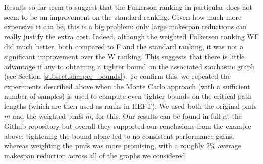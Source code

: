 \documentclass[12pt]{article}
\begin{document}


Results so far seem to suggest that the Fulkerson ranking in particular does not seem to be an improvement on the standard ranking. Given how much more expensive it can be, this is a big problem: only large makespan reductions can really justify the extra cost. Indeed, although the weighted Fulkerson ranking WF did much better, both compared to F and the standard ranking, it was not a significant improvement over the W ranking. This suggests that there is little advantage if any to obtaining a tighter bound on the associated stochastic graph (see Section \ref{subsect.sharper_bounds}). To confirm this, we repeated the experiments described above when the Monte Carlo approach (with a sufficient number of samples) is used to compute even tighter bounds on the critical path lengths (which are then used as ranks in HEFT). We used both the original pmfs $m$ and the weighted pmfs $\hat{m}_i$ for this. Our results can be found in full at the Github repository but overall they supported our conclusions from the example above: tightening the bound alone led to no consistent performance gains, whereas weighting the pmfs was more promising, with a roughly $2\%$ average makespan reduction across all of the graphs we considered.       
\end{document}
